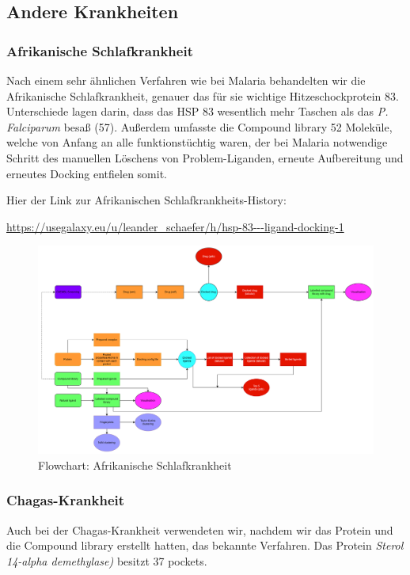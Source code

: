 \documentclass[10pt]{article}
\begin{document}
    \subsection{Andere Krankheiten}\label{subsubsec:andere-krankheiten}

    \subsubsection{Afrikanische Schlafkrankheit}
    Nach einem sehr ähnlichen Verfahren wie bei Malaria behandelten wir die Afrikanische Schlafkrankheit, genauer das
    für sie wichtige Hitzeschockprotein 83. Unterschiede lagen darin, dass das HSP 83 wesentlich mehr Taschen als
    das \emph{P. Falciparum} besaß (57). Außerdem umfasste die Compound library 52 Moleküle, welche von Anfang an alle
    funktionstüchtig waren, der bei Malaria notwendige Schritt des manuellen Löschens von Problem-Liganden, erneute
    Aufbereitung und erneutes Docking entfielen somit.

    Hier der Link zur Afrikanischen Schlafkrankheits-History:

    \url{https://usegalaxy.eu/u/leander_schaefer/h/hsp-83---ligand-docking-1}


    \begin{figure}[H]
        \centering
        \includegraphics[width=0.7\linewidth]{afrikanische schlafkrankheit-flowchart}
        \caption{Flowchart: Afrikanische Schlafkrankheit}
    \end{figure}

    \subsubsection{Chagas-Krankheit}
    Auch bei der Chagas-Krankheit verwendeten wir, nachdem wir das Protein und die Compound library erstellt hatten,
    das bekannte Verfahren.
    Das Protein \emph{Sterol 14-alpha demethylase)} besitzt 37 pockets.
\end{document}
